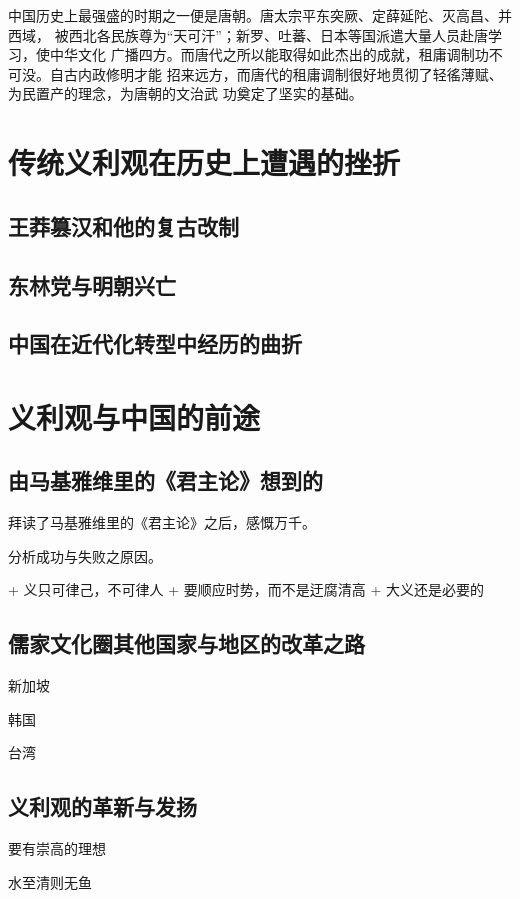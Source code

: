 中国历史上最强盛的时期之一便是唐朝。唐太宗平东突厥、定薛延陀、灭高昌、并西域，
被西北各民族尊为“天可汗”；新罗、吐蕃、日本等国派遣大量人员赴唐学习，使中华文化
广播四方。而唐代之所以能取得如此杰出的成就，租庸调制功不可没。自古内政修明才能
招来远方，而唐代的租庸调制很好地贯彻了轻徭薄赋、为民置产的理念，为唐朝的文治武
功奠定了坚实的基础。



\section{传统义利观在历史上遭遇的挫折}


\subsection{王莽篡汉和他的复古改制}

\subsection{东林党与明朝兴亡}

\subsection{中国在近代化转型中经历的曲折}

\section{义利观与中国的前途}

\subsection{由马基雅维里的《君主论》想到的}

拜读了马基雅维里的《君主论》之后，感慨万千。

分析成功与失败之原因。

+ 义只可律己，不可律人
+ 要顺应时势，而不是迂腐清高
+ 大义还是必要的

\subsection{儒家文化圈其他国家与地区的改革之路}

新加坡

韩国

台湾

\subsection{义利观的革新与发扬}

要有崇高的理想

水至清则无鱼

\printbibliography
\nocite{*}


